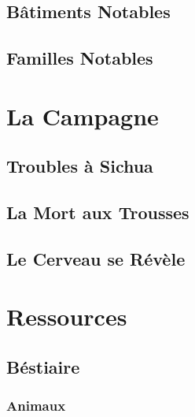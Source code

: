 \documentclass{dd}
\begin{document}


\chapter{Bâtiments Notables}









\chapter{Familles Notables}



\part{La Campagne}


\chapter{Troubles à Sichua}



\chapter{La Mort aux Trousses}


\chapter{Le Cerveau se Révèle}

\part{Ressources}

\chapter{Béstiaire}

\section{Animaux}
\end{document}
